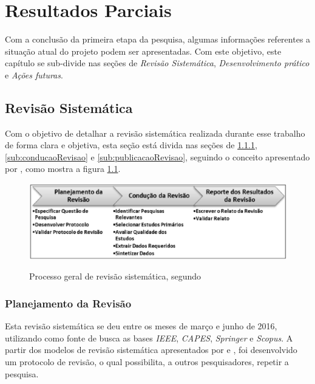 \chapter[Resultados Parciais]{Resultados Parciais}
\label{sec:resultados_parciais}

Com a conclusão da primeira etapa da pesquisa, algumas informações referentes a situação atual do projeto podem ser apresentadas. Com este objetivo, este capítulo se sub-divide nas seções de \textit{Revisão Sistemática}, \textit{Desenvolvimento prático} e \textit{Ações futuras}.

\section{Revisão Sistemática} %
\label{sec:revisão_sistemática}

	Com o objetivo de detalhar a revisão sistemática realizada durante esse trabalho de forma clara e objetiva, esta seção está divida nas seções de \ref{sub:planejamentoRevisao}, \ref{sub:conducaoRevisao} e \ref{sub:publicacaoRevisao}, seguindo o conceito apresentado por \cite{Kitchenham}, como mostra a figura \ref{img:processoGeralRevisao}.

	\begin{figure}[H]
			\centering
			\caption{Processo geral de revisão sistemática, segundo \cite{Kitchenham}}
			\includegraphics[scale=0.7]{figuras/processoGeralRevisao.eps}
			\label{img:processoGeralRevisao}
		\end{figure}

	\subsection{Planejamento da Revisão} %
	\label{sub:planejamentoRevisao}

		Esta revisão sistemática se deu entre os meses de março e junho de 2016, utilizando como fonte de busca as bases \textit{IEEE}, \textit{CAPES}, \textit{Springer} e \textit{Scopus}. A partir dos modelos de revisão sistemática apresentados por \cite{Kitchenham} e \cite{exemploRevisaoSistematica}, foi desenvolvido um protocolo de revisão, o qual possibilita, a outros pesquisadores, repetir a pesquisa.

